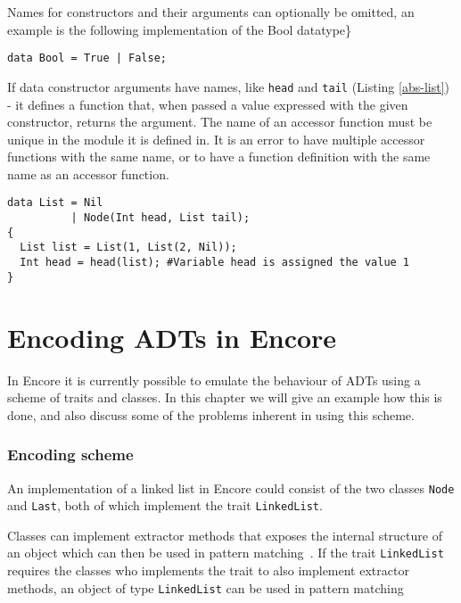 \documentclass[10pt]{report}
\def\code#1{\texttt{#1}} %
\begin{document}
\par{Names for constructors and their arguments can optionally be omitted, an example is the following implementation of the Bool datatype\}

\begin{lstlisting}[language=encore,caption={Actual definition of built-in type Bool},label=test-kiko]
data Bool = True | False;
\end{lstlisting}

\par{If data constructor arguments have names, like \code{head} and \code{tail} (Listing \ref{abs-list}) - it defines a function that, when passed a value expressed with the given constructor, returns the argument.  The name of an accessor function must be unique in the module it is defined in. It is an error to have multiple accessor functions with the same name, or to have a function definition with the same name as an accessor function.}

\begin{lstlisting}[language=encore,caption={Accessor funtion in ABS},label=abs-list]
data List = Nil
          | Node(Int head, List tail);
{
  List list = List(1, List(2, Nil));
  Int head = head(list); #Variable head is assigned the value 1
}
\end{lstlisting}

\chapter{Encoding ADTs in Encore}
\par{In Encore it is currently possible to emulate the behaviour of ADTs using a scheme of traits and classes. In this chapter we will give an example how this is done, and also discuss some of the problems inherent in using this scheme.}
\subsection{Encoding scheme}
\par{An implementation of a linked list in Encore could consist of the two classes \code{Node} and \code{Last}, both of which implement the trait \code{LinkedList}.}
\par{Classes can implement extractor methods that exposes the internal structure of an object which can then be used in pattern matching~\cite{Lundin930151}. If the trait \code{LinkedList} requires the classes who implements the trait to also implement extractor methods, an object of type \code{LinkedList} can be used in pattern matching}

}
\end{document}
